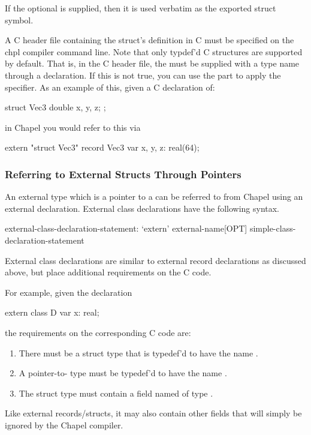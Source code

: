 If the optional  is supplied, then it is used verbatim as
the exported struct symbol.

A C header file containing the struct's definition in C must be specified on the
chpl compiler command line.  Note that only typdef'd C structures are supported
by default.  That is, in the C header file, the  must be supplied
with a type name through a  declaration. If this is not true, you
can use the  part to apply the  specifier.
As an example of this, given a C declaration of:

\begin{chapel}
  struct Vec3 {
    double x, y, z;
  };
\end{chapel}

in Chapel you would refer to this  via

\begin{chapel}
  extern "struct Vec3" record Vec3 {
    var x, y, z: real(64);
  }
\end{chapel}


\subsubsection{Referring to External Structs Through Pointers}
\label{Referring_to_External_Structs_Through_Pointers}

An external type which is a pointer to a  can be referred to from
Chapel using an external  declaration.  External class declarations
have the following syntax.
\begin{syntax}
external-class-declaration-statement:
  `extern' external-name[OPT] simple-class-declaration-statement
\end{syntax}
External class declarations are similar to external record declarations as
discussed above, but place additional requirements on the C code.

For example, given the declaration
\begin{chapel}
  extern class D {
    var x: real;
  }
\end{chapel}
\noindent
the requirements on the corresponding C code are:
\begin{enumerate}
\item There must be a struct type that is typedef'd to have the name .
\item A pointer-to- type must be typedef'd to have the name .
\item The  struct type must contain a field named  of type .
\end{enumerate}
\noindent
Like external records/structs, it may also contain other fields
that will simply be ignored by the Chapel compiler.

